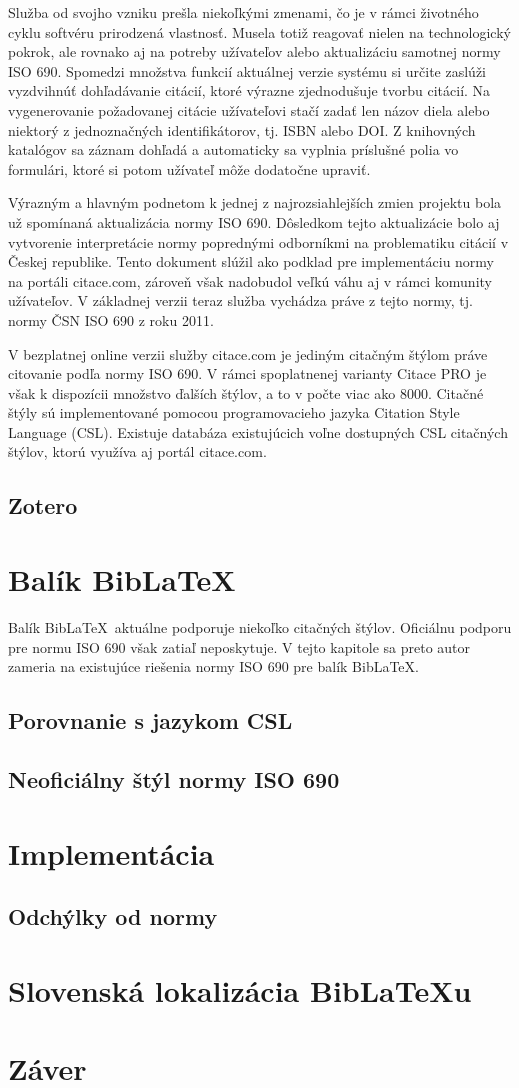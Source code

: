 \documentclass{fithesis3}
\begin{document}
	Služba od svojho vzniku prešla niekoľkými zmenami, čo je v rámci životného cyklu softvéru prirodzená vlastnosť. Musela totiž reagovať nielen na technologický pokrok, ale rovnako aj na potreby užívateľov alebo aktualizáciu samotnej normy ISO 690. Spomedzi množstva funkcií aktuálnej verzie systému si určite zaslúži vyzdvihnúť dohľadávanie citácií, ktoré výrazne zjednodušuje tvorbu citácií. Na vygenerovanie požadovanej citácie užívateľovi stačí zadať len názov diela alebo niektorý z jednoznačných identifikátorov, tj. ISBN alebo DOI. Z knihovných katalógov sa záznam dohľadá a automaticky sa vyplnia príslušné polia vo formulári, ktoré si potom užívateľ môže dodatočne upraviť.

	Výrazným a hlavným podnetom k jednej z najrozsiahlejších zmien projektu bola už spomínaná aktualizácia normy ISO 690. Dôsledkom tejto aktualizácie bolo aj vytvorenie interpretácie normy poprednými odborníkmi na problematiku citácií v Českej republike. Tento dokument slúžil ako podklad pre implementáciu normy na portáli citace.com, zároveň však nadobudol veľkú váhu aj v rámci komunity užívateľov. V základnej verzii teraz služba vychádza práve z tejto normy, tj. normy ČSN ISO 690 z roku 2011.

	V bezplatnej online verzii služby citace.com je jediným citačným štýlom práve citovanie podľa normy ISO 690. V rámci spoplatnenej varianty Citace PRO je však k dispozícii množstvo ďalších štýlov, a to v počte viac ako 8000. Citačné štýly sú implementované pomocou programovacieho jazyka Citation Style Language (CSL). Existuje databáza existujúcich voľne dostupných CSL citačných štýlov, ktorú využíva aj portál citace.com.

	\section{Zotero}
	
\chapter{Balík Bib\LaTeX}
Balík Bib\LaTeX\, aktuálne podporuje niekoľko citačných štýlov. Oficiálnu podporu pre normu ISO 690 však zatiaľ neposkytuje. V tejto kapitole sa preto autor zameria na existujúce riešenia normy ISO 690 pre balík Bib\LaTeX.

	\section{Porovnanie s jazykom CSL}
	\section{Neoficiálny štýl normy ISO 690}

\chapter{Implementácia}
	\section{Odchýlky od normy}

\chapter{Slovenská lokalizácia Bib\LaTeX u}

\chapter{Záver}
\end{document}
